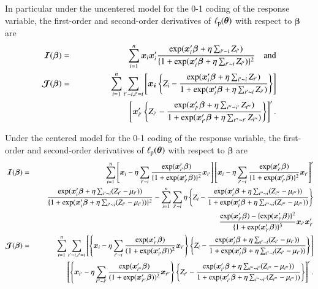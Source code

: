 \documentclass[authoryear,review, 11pt]{elsarticle}
\begin{document}
In particular under the uncentered model for the 0-1 coding of the response variable, the first-order and second-order derivatives of $\ell_{\rm p}(\bm{\theta})$ with respect to $\bm{\beta}$ are
\begin{eqnarray*}
\bm{\mathcal{I}}(\bm{\beta})&=&\sum_{i=1}^n\bm{x}_i\bm{x}_i'\frac{\exp({\bm{x}_i'\bm{\beta}+\eta\sum_{i'\thicksim i}Z_{i'}})}{\{1+\exp(\bm{x}_i'\bm{\beta}+\eta\sum_{i'\thicksim i}Z_{i'})\}^2}\quad\mbox{and} \\
\bm{\mathcal{J}}(\bm{\beta})&=&\sum_{i=1}^n\sum_{i'\thicksim i, i'=i}\left[\bm{x_i}\left\{Z_i-\frac{\exp(\bm{x}_i'\bm{\beta}+\eta\sum_{i'\thicksim i}Z_{i'})}{1+\exp(\bm{x}_i'\bm{\beta}+\eta\sum_{i'\thicksim i}Z_{i'})}\right\}\right]\\ 
&&\quad\quad\quad\quad\quad\quad\left[\bm{x}_{i'}'\left\{Z_{i'}-\frac{\exp({\bm{x}_{i'}'\bm{\beta}+\eta\sum_{i''\thicksim i'}Z_{i''}})}{1+\exp(\bm{x}_{i'}'\bm{\beta}+\eta\sum_{i''\thicksim i'}Z_{i''})}\right\}\right]'.
\end{eqnarray*}

Under the centered model for the 0-1 coding of the response variable, the first-order and second-order derivatives of $\ell_{\rm p}(\bm{\theta})$ with respect to $\bm{\beta}$ are
\begin{eqnarray*}
\bm{\mathcal{I}}(\bm{\beta})&=&
\sum_{i=1}^n \left[ \bm{x}_i-\eta \sum_{i' \thicksim i} \frac{\exp(\bm{x}_{i'}'\bm{\beta})}{\{1+\exp(\bm{x}_{i'}'\bm{\beta})\}^2}\bm{x}_{i'}\right]\left[ \bm{x}_i-\eta \sum_{i' \thicksim i} \frac{\exp(\bm{x}_{i'}'\bm{\beta})}{\{1+\exp(\bm{x}_{i'}'\bm{\beta})\}^2}\bm{x}_{i'}\right]'\\ 
&&
\frac{\exp({\bm{x}_i'\bm{\beta}+\eta\sum_{i' \thicksim i}(Z_{i'}-\mu_{i'})})} {\{1+\exp(\bm{x}_i'\bm{\beta}+\eta\sum_{i' \thicksim i}(Z_{i'}-\mu_{i'}))\}^2}- \sum_{i=1}^n \sum_{ i' \thicksim i} \eta \left\{Z_i-\frac{\exp({\bm{x}_i'\bm{\beta}+\eta\sum_{i'' \thicksim i}(Z_{i''}-\mu_{i''})})}{1+\exp(\bm{x}_i'\bm{\beta}+\eta\sum_{i'' \thicksim i}(Z_{i''}-\mu_{i''}))}\right\} \\
&& 
\frac{\exp(\bm{x}_{i'}'\bm{\beta})-\{\exp(\bm{x}_{i'}'\bm{\beta})\}^2}{\{1+\exp(\bm{x}_{i'}'\bm{\beta})\}^3}\bm{x}_{i'}\bm{x}_{i'}'
\\
\bm{\mathcal{J}}(\bm{\beta})&=&\sum_{i=1}^n\sum_{i' \thicksim i, i'=i}\left[ \left\{ \bm{x}_i-\eta \sum_{i' \thicksim i} \frac{\exp(\bm{x}_{i'}'\bm{\beta})}{(1+\exp(\bm{x}_{i'}'\bm{\beta}))^2}\bm{x}_{i'} \right\} \left\{Z_i-\frac{\exp({\bm{x}_i'\bm{\beta}+\eta\sum_{i' \thicksim i}(Z_{i'}-\mu_{i'})})}{1+\exp(\bm{x}_i'\bm{\beta}+\eta\sum_{i' \thicksim i}(Z_{i'}-\mu_{i'}))}\right\}\right]\\ 
&&\quad\quad\quad\quad\left[ \left\{ \bm{x}_{i'}-\eta \sum_{i'' \thicksim {i'}} \frac{\exp(\bm{x}_{i''}'\bm{\beta})}{(1+\exp(\bm{x}_{i''}'\bm{\beta}))^2}\bm{x}_{i''} \right\} \left\{Z_{i'}-\frac{\exp({\bm{x}_{i'}'\bm{\beta}+\eta\sum_{i'' \thicksim {i'}}(Z_{i''}-\mu_{i''})})}{1+\exp(\bm{x}_{i'}'\bm{\beta}+\eta\sum_{i'' \thicksim {i'}}(Z_{i''}-\mu_{i''}))}\right\}\right]'.
\end{eqnarray*}
\end{document}
